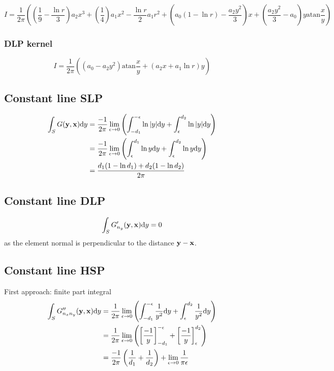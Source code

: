 \documentclass[a4paper,11pt]{article}
\newcommand{\td}{\mathrm{d}}
\newcommand{\atan}{\mathrm{atan}}
\begin{document}
\begin{equation}
I = \frac{1}{2\pi} \left(
\left(\frac{1}{9} - \frac{\ln r}{3}\right) a_2 x^3
+ \left(\frac{1}{4}\right) a_1 x^2
- \frac{\ln r}{2} a_1 r^2
+ \left(a_0 \left(1 - \ln r\right) - \frac{a_2 y^2}{3}\right) x
+ \left(\frac{a_2 y^2}{3} - a_0 \right) y \atan\frac{x}{y}
\right)
\end{equation}

\subsubsection{DLP kernel}

\begin{equation}
I = \frac{1}{2\pi} \left(
\left( a_0 - a_2 y^2\right) \atan \frac{x}{y} + \left(a_2 x + a_1 \ln r\right) y
\right)
\end{equation}

\subsection{Constant line SLP}

\begin{align}
\int_{S} G({\bf y}, {\bf x}) \td y
& = \frac{-1}{2\pi}\lim_{\epsilon \to 0}
\left( \int_{-d_1}^{-\epsilon} \ln |y| \td y + \int_{\epsilon}^{d_2}  \ln |y| \td y \right) \nonumber \\
& = \frac{-1}{2\pi}\lim_{\epsilon \to 0}
\left( \int_{\epsilon}^{d_1} \ln y \td y + \int_{\epsilon}^{d_2}  \ln y \td y \right) \nonumber \\
&=
\frac{d_1(1-\ln d_1) + d_2(1-\ln d_2)}{2\pi}
\end{align}

\subsection{Constant line DLP}

\begin{equation}
\int_{S} G'_{n_y}({\bf y}, {\bf x}) \td y = 0
\end{equation}
%
as the element normal is perpendicular to the distance ${\bf y}-{\bf x}$.

\subsection{Constant line HSP}

First approach: finite part integral
%
\begin{align}
\int_{S} G''_{n_x n_y}({\bf y}, {\bf x}) \td y
&= \frac{1}{2\pi} \lim_{\epsilon \to 0} \left(\int_{-d_1}^{-\epsilon} \frac{1}{y^2}\td y + \int_{\epsilon}^{d_2} \frac{1}{y^2} \td y\right) \nonumber \\
&= \frac{1}{2\pi} \lim_{\epsilon \to 0} \left(\left[\frac{-1}{y}\right]_{-d_1}^{-\epsilon} +  \left[\frac{-1}{y}\right]_{\epsilon}^{d_2} \right)
\nonumber \\
&= \frac{-1}{2\pi} \left(\frac{1}{d_1} +  \frac{1}{d_2} \right) + \lim_{\epsilon \to 0} \frac{1}{\pi\epsilon}
\end{align}
\end{document}
